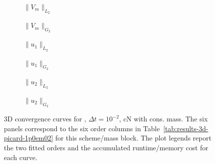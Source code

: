 \begin{figure}[p]
\centering
\begin{subfigure}{0.485\linewidth}
\centering
{}
\caption{$\|V_m\|_{L_2}$}
\label{fig:results-3d-picard-1p0em02-cranknicolson-consistent-a}
\end{subfigure}
\hfill
\begin{subfigure}{0.485\linewidth}
\centering
{}
\caption{$\|V_m\|_{G_2}$}
\label{fig:results-3d-picard-1p0em02-cranknicolson-consistent-b}
\end{subfigure}
\par\vspace{0.8em}
\begin{subfigure}{0.485\linewidth}
\centering
{}
\caption{$\|u_1\|_{L_2}$}
\label{fig:results-3d-picard-1p0em02-cranknicolson-consistent-c}
\end{subfigure}
\hfill
\begin{subfigure}{0.485\linewidth}
\centering
{}
\caption{$\|u_1\|_{G_2}$}
\label{fig:results-3d-picard-1p0em02-cranknicolson-consistent-d}
\end{subfigure}
\par\vspace{0.8em}
\begin{subfigure}{0.485\linewidth}
\centering
{}
\caption{$\|u_2\|_{L_2}$}
\label{fig:results-3d-picard-1p0em02-cranknicolson-consistent-e}
\end{subfigure}
\hfill
\begin{subfigure}{0.485\linewidth}
\centering
{}
\caption{$\|u_2\|_{G_2}$}
\label{fig:results-3d-picard-1p0em02-cranknicolson-consistent-f}
\end{subfigure}
\caption{3D convergence curves for , $\Delta t=10^{-2}$, cN with cons. mass. The six panels correspond to the six order columns in Table~\ref{tab:results-3d-picard-1p0em02} for this scheme/mass block. The plot legends report the two fitted orders and the accumulated runtime/memory cost for each curve.}
\label{fig:results-3d-picard-1p0em02-cranknicolson-consistent}
\end{figure}
\FloatBarrier


